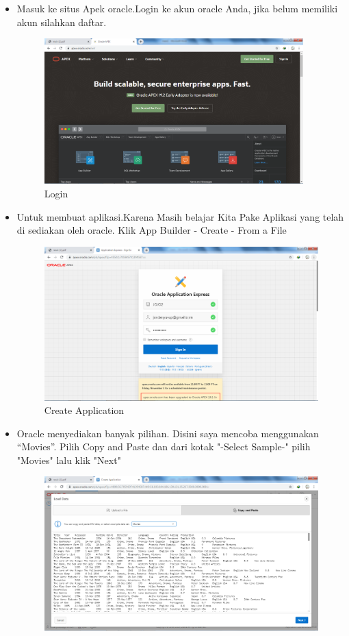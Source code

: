 \documentclass[12pt, times new roman]{article}
\begin{document}
\begin{itemize}
\item Masuk ke situs Apek oracle.Login ke akun oracle Anda, jika belum memiliki akun silahkan daftar.
\begin{figure}[!htbp]
	\centering
	\includegraphics[width=10cm]{figures/Screenshot_1.png}
	\caption{Login}
\end{figure}
\item Untuk membuat aplikasi.Karena Masih belajar Kita Pake Aplikasi yang telah di sediakan oleh oracle. Klik App Builder - Create - From a File 
\begin{figure}[!htbp]
	\centering
	\includegraphics[width=12cm]{figures/Screenshot_2.png}
	\caption{Create Application}
\end{figure}
\item Oracle menyediakan banyak pilihan. Disini saya mencoba menggunakan “Movies”. Pilih Copy and Paste dan dari kotak "-Select Sample-" pilih "Movies" lalu klik "Next"
\begin{figure}[!htpb]
	\centering
	\includegraphics[width=12cm]{figures/Screenshot_3.png}

\end{figure}
\end{itemize}
\end{document}
